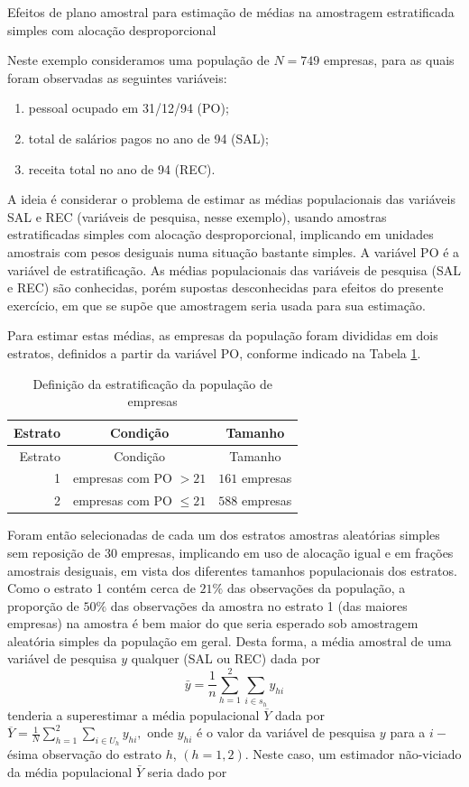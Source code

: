 \documentclass[]{book}
\theoremstyle{definition}
\theoremstyle{definition}
\theoremstyle{definition}
\theoremstyle{remark}
\let\BeginKnitrBlock\begin \let\EndKnitrBlock\end
\begin{document}
\BeginKnitrBlock{example}
\protect\hypertarget{exm:deffuni}{}{\label{exm:deffuni} }Efeitos de plano
amostral para estimação de médias na amostragem estratificada simples
com alocação desproporcional
\EndKnitrBlock{example}

Neste exemplo consideramos uma população de \(N=749\) empresas, para as
quais foram observadas as seguintes variáveis:

\begin{enumerate}
\def\labelenumi{\arabic{enumi}.}
\item
  pessoal ocupado em 31/12/94 (PO);
\item
  total de salários pagos no ano de 94 (SAL);
\item
  receita total no ano de 94 (REC).
\end{enumerate}

A ideia é considerar o problema de estimar as médias populacionais das
variáveis SAL e REC (variáveis de pesquisa, nesse exemplo), usando
amostras estratificadas simples com alocação desproporcional, implicando
em unidades amostrais com pesos desiguais numa situação bastante
simples. A variável PO é a variável de estratificação. As médias
populacionais das variáveis de pesquisa (SAL e REC) são conhecidas,
porém supostas desconhecidas para efeitos do presente exercício, em que
se supõe que amostragem seria usada para sua estimação.

Para estimar estas médias, as empresas da população foram divididas em
dois estratos, definidos a partir da variável PO, conforme indicado na
Tabela \ref{tab:estempr}.

\begin{longtable}[]{@{}rcc@{}}
\caption{\label{tab:estempr} Definição da estratificação da população de
empresas}\tabularnewline
\toprule
Estrato & Condição & Tamanho\tabularnewline
\midrule
\endfirsthead
\toprule
Estrato & Condição & Tamanho\tabularnewline
\midrule
\endhead
1 & empresas com PO \(>21\) & \(161\) empresas\tabularnewline
2 & empresas com PO \(\leq21\) & \(588\) empresas\tabularnewline
\bottomrule
\end{longtable}

Foram então selecionadas de cada um dos estratos amostras aleatórias
simples sem reposição de \(30\) empresas, implicando em uso de alocação
igual e em frações amostrais desiguais, em vista dos diferentes tamanhos
populacionais dos estratos. Como o estrato 1 contém cerca de \(21\%\)
das observações da população, a proporção de \(50\%\) das observações da
amostra no estrato 1 (das maiores empresas) na amostra é bem maior do
que seria esperado sob amostragem aleatória simples da população em
geral. Desta forma, a média amostral de uma variável de pesquisa \(y\)
qualquer (SAL ou REC) dada por \[
\bar{y}=\frac{1}{n}\sum\limits_{h=1}^{2}\sum\limits_{i\in s_{h}}y_{hi} \]
tenderia a superestimar a média populacional \(\overline{Y}\) dada por
\(\overline{Y}=\frac{1}{N}\sum\limits_{h=1}^{2}\sum_{i\in U_{h}}y_{hi},\)
onde \(y_{hi}\) é o valor da variável de pesquisa \(y\) para a
\(i-\)ésima observação do estrato \(h\), \((h=1,2)\). Neste caso, um
estimador não-viciado da média populacional \(\bar{Y}\) seria dado por
\end{document}
